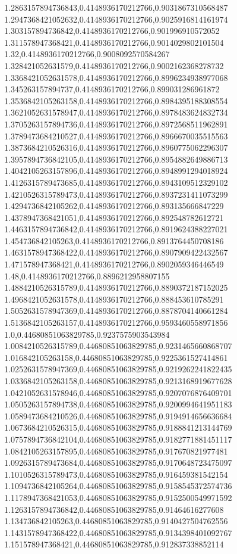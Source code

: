 1.2863157894736843,0.4148936170212766,0.9031867310568487
1.2947368421052632,0.4148936170212766,0.9025916814161974
1.303157894736842,0.4148936170212766,0.901996910572052
1.311578947368421,0.4148936170212766,0.9014029802101504
1.32,0.4148936170212766,0.9008092570584267
1.328421052631579,0.4148936170212766,0.9002162368278732
1.3368421052631578,0.4148936170212766,0.8996234938977068
1.345263157894737,0.4148936170212766,0.899031286961872
1.3536842105263158,0.4148936170212766,0.8984395188308554
1.3621052631578947,0.4148936170212766,0.8978483624832734
1.3705263157894736,0.4148936170212766,0.8972568511962891
1.3789473684210527,0.4148936170212766,0.8966670035515563
1.3873684210526316,0.4148936170212766,0.8960775062296307
1.3957894736842105,0.4148936170212766,0.8954882649886713
1.4042105263157896,0.4148936170212766,0.8948991294018924
1.4126315789473685,0.4148936170212766,0.8943109512329102
1.4210526315789473,0.4148936170212766,0.8937231411073299
1.4294736842105262,0.4148936170212766,0.893135666847229
1.4378947368421051,0.4148936170212766,0.892548782612721
1.4463157894736842,0.4148936170212766,0.8919624388227021
1.454736842105263,0.4148936170212766,0.8913764450708186
1.4631578947368422,0.4148936170212766,0.8907909422432567
1.471578947368421,0.4148936170212766,0.8902059346446549
1.48,0.4148936170212766,0.8896212958807155
1.4884210526315789,0.4148936170212766,0.8890372187152025
1.4968421052631578,0.4148936170212766,0.888453610785291
1.5052631578947369,0.4148936170212766,0.8878704140661284
1.5136842105263157,0.4148936170212766,0.9593460558971856
1.0,0.44680851063829785,0.9237575903543984
1.0084210526315789,0.44680851063829785,0.9231465660868707
1.016842105263158,0.44680851063829785,0.9225361527414861
1.0252631578947369,0.44680851063829785,0.9219262241822435
1.0336842105263158,0.44680851063829785,0.9213168919677628
1.0421052631578946,0.44680851063829785,0.9207076876409701
1.0505263157894738,0.44680851063829785,0.9200994641951183
1.0589473684210526,0.44680851063829785,0.9194914656636684
1.0673684210526315,0.44680851063829785,0.9188841213144769
1.0757894736842104,0.44680851063829785,0.9182771881451117
1.0842105263157895,0.44680851063829785,0.917670821977481
1.0926315789473684,0.44680851063829785,0.9170648723475097
1.1010526315789473,0.44680851063829785,0.916459381542154
1.1094736842105264,0.44680851063829785,0.9158545372574736
1.1178947368421053,0.44680851063829785,0.9152500549971592
1.1263157894736842,0.44680851063829785,0.91464616277608
1.134736842105263,0.44680851063829785,0.9140427504762556
1.1431578947368422,0.44680851063829785,0.9134398401092767
1.151578947368421,0.44680851063829785,0.912837338852114
